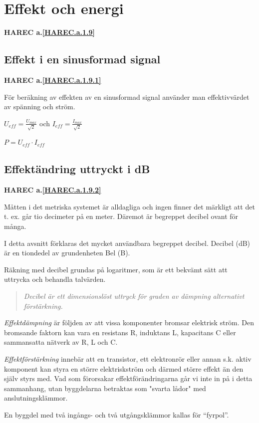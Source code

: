 \section{Effekt och energi}
\textbf{HAREC a.\ref{HAREC.a.1.9}\label{myHAREC.a.1.9}}

\subsection{Effekt i en sinusformad signal}
\textbf{HAREC a.\ref{HAREC.a.1.9.1}\label{myHAREC.a.1.9.1}}

För beräkning av effekten av en sinusformad signal använder man effektivvärdet
av spänning och ström.

\(U_{eff} = \frac{U_{max}}{\sqrt{2}}\) och \(I_{eff} = \frac{I_{max}}{\sqrt{2}}\)

\(P = U_{eff} \cdot I_{eff}\)

\subsection{Effektändring uttryckt i dB}
\textbf{HAREC a.\ref{HAREC.a.1.9.2}\label{myHAREC.a.1.9.2}}

Måtten i det metriska systemet är alldagliga och ingen finner det märkligt att
det t. ex. går tio decimeter på en meter. Däremot är begreppet decibel ovant för
många.

I detta avsnitt förklaras det mycket användbara begreppet decibel. Decibel (dB)
är en tiondedel av grundenheten Bel (B).

Räkning med decibel grundas på logaritmer, som är ett bekvämt sätt att uttrycka
och behandla talvärden.

\begin{quote}\emph{
Decibel är ett dimensionslöst uttryck för graden av dämpning alternativt
förstärkning.
}\end{quote}

\emph{Effektdämpning} är följden av att vissa komponenter bromsar elektrisk ström. Den
bromsande faktorn kan vara en resistans R, induktans L, kapacitans C eller
sammansatta nätverk av R, L och C.

\emph{Effektförstärkning} innebär att en transistor, ett elektronrör eller annan s.k.
aktiv komponent kan styra en större elektriskström och därmed större effekt än
den själv styrs med. Vad som förorsakar effektförändringarna går vi inte in på i
detta sammanhang, utan byggdelarna betraktas som "svarta lådor" med
anslutningsklämmor.

En byggdel med två ingångs- och två utgångsklämmor kallas för ``fyrpol''.

